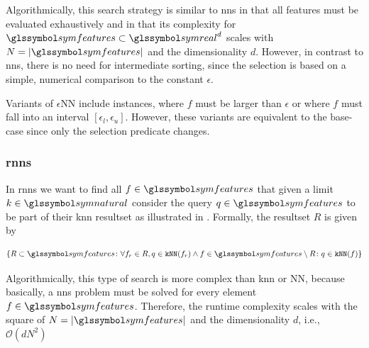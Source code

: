 Algorithmically, this search strategy is similar to \acrshort{nns} in that all features must be evaluated exhaustively and in that its complexity for $\symfeatures \subset \symreal^d$ scales with $N = |\symfeatures|$ and the dimensionality $d$. However, in contrast to \acrshort{nns}, there is no need for intermediate sorting, since the selection is based on a simple, numerical comparison to the constant $\epsilon$.

Variants of $\epsilon$NN include instances, where $f$ must be larger than $\epsilon$ or where $f$ must fall into an interval $[ \epsilon_l, \epsilon_u ]$. However, these variants are equivalent to the base-case since only the selection predicate changes.

\subsubsection{\acrfull{rnns}}

In \acrshort{rnns} we want to find all $f \in \symfeatures$ that given a limit $k \in \symnatural$ consider the query $q \in \symfeatures$ to be part of their \acrshort{knn} resultset as illustrated in . Formally, the resultset $R$ is given by  

\begin{equation}
    \label{eq:rknn}
    \lbrace R \subset \symfeatures \colon \forall f_r \in R, q \in \texttt{kNN}(f_r) \wedge f \in \symfeatures \setminus R \colon q \in \texttt{kNN}(f)  \rbrace
\end{equation}

Algorithmically, this type of search is more complex than \acrshort{knn} or \textepsilon NN, because basically, a \acrshort{nns} problem must be solved for every element $f \in \symfeatures$. Therefore, the runtime complexity scales with the square of $N = |\symfeatures|$ and the dimensionality $d$, i.e., $\mathcal{O}(dN^2)$

